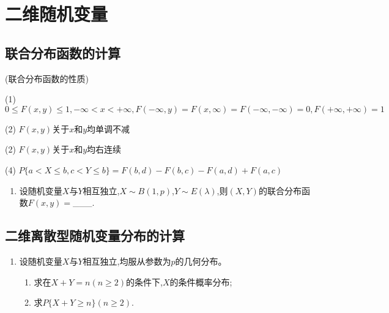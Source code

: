 \documentclass[12pt, a4paper, oneside, UTF8]{ctexbook}
\begin{document}
% 
\else
\fi
\chapter{二维随机变量}

\section{联合分布函数的计算}
\begin{remark}
    (联合分布函数的性质)
    \item[(1)] $0\leq F(x,y)\leq 1,-\infty<x<+\infty, F(-\infty,y)=F(x,\infty)=F(-\infty,-\infty)=0,F(+\infty,+\infty)=1$
    \item[(2)] $F(x,y)$关于$x$和$y$均单调不减
    \item[(2)] $F(x,y)$关于$x$和$y$均右连续
    \item[(4)] $P\{a<X\leq b,c<Y\leq b\}=F(b,d)-F(b,c)-F(a,d)+F(a,c)$  
\end{remark}

\begin{enumerate}[label=\arabic*.]
    \item 设随机变量$X$与$Y$相互独立,$X\sim B(1,p)$,$Y\sim E(\lambda)$,则$(X,Y)$的联合分布函数$F(x,y)=$\_\_\_.
    
    \begin{solution}
    \newpage
    \end{solution}
\end{enumerate}

\section{二维离散型随机变量分布的计算}

\begin{enumerate}[label=\arabic*.,start=2]
    \item 设随机变量$X$与$Y$相互独立,均服从参数为$p$的几何分布。
    \begin{enumerate}
        \item 求在$X+Y=n(n\geq 2)$的条件下,$X$的条件概率分布;
        \item 求$P\{X+Y\geq n\}(n\geq 2)$.
    \end{enumerate}
    
    \begin{solution}
    \newpage
    \end{solution}
\end{enumerate}
\end{document}

